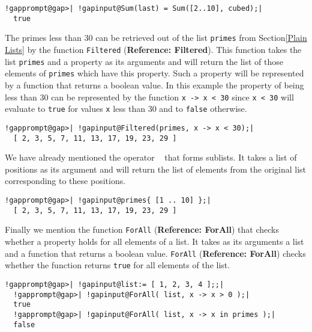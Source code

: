 \documentclass[a4paper,11pt]{report}
\begin{document}
{{ 
\begin{Verbatim}[commandchars=!@|,fontsize=\small,frame=single,label=Example]
  !gapprompt@gap>| !gapinput@Sum(last) = Sum([2..10], cubed);|
  true
\end{Verbatim}
 

 The primes less than 30 can be retrieved out of the list \texttt{primes} from Section{\nobreakspace}\ref{Plain Lists} by the function \texttt{Filtered} (\textbf{Reference: Filtered}). This function takes the list \texttt{primes} and a property as its arguments and will return the list of those elements of \texttt{primes} which have this property. Such a property will be represented by a function
that returns a boolean value. In this example the property of being less than
30 can be represented by the function \texttt{x -{\textgreater} x {\textless} 30} since \texttt{x {\textless} 30} will evaluate to \texttt{true} for values \texttt{x} less than 30 and to \texttt{false} otherwise. 

 
\begin{Verbatim}[commandchars=!@|,fontsize=\small,frame=single,label=Example]
  !gapprompt@gap>| !gapinput@Filtered(primes, x -> x < 30);|
  [ 2, 3, 5, 7, 11, 13, 17, 19, 23, 29 ]
\end{Verbatim}
 

 We have already mentioned the operator \texttt{\texttt{} \texttt{}} that forms sublists. It takes a list of positions as its argument and will
return the list of elements from the original list corresponding to these
positions. 

 
\begin{Verbatim}[commandchars=!@|,fontsize=\small,frame=single,label=Example]
  !gapprompt@gap>| !gapinput@primes{ [1 .. 10] };|
  [ 2, 3, 5, 7, 11, 13, 17, 19, 23, 29 ]
\end{Verbatim}
 

 Finally we mention the function \texttt{ForAll} (\textbf{Reference: ForAll}) that checks whether a property holds for all elements of a list. It takes as
its arguments a list and a function that returns a boolean value. \texttt{ForAll} (\textbf{Reference: ForAll}) checks whether the function returns \texttt{true} for all elements of the list. 

 
\begin{Verbatim}[commandchars=!@|,fontsize=\small,frame=single,label=Example]
  !gapprompt@gap>| !gapinput@list:= [ 1, 2, 3, 4 ];;|
  !gapprompt@gap>| !gapinput@ForAll( list, x -> x > 0 );|
  true
  !gapprompt@gap>| !gapinput@ForAll( list, x -> x in primes );|
  false
\end{Verbatim}
 

}}
\end{document}
